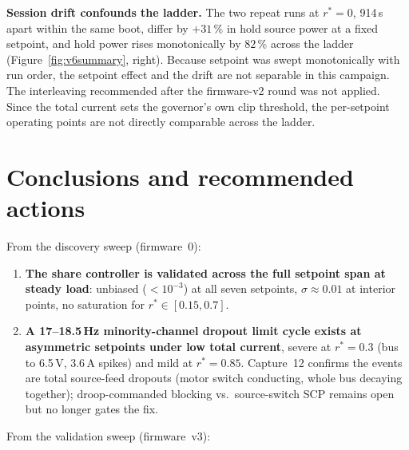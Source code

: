 \documentclass[11pt]{article}
\begin{document}
\textbf{Session drift confounds the ladder.} The two repeat runs at $r^\ast=0$,
914\,s apart within the same boot, differ by $+31\,\%$ in hold source power at a
fixed setpoint, and hold power rises monotonically by $82\,\%$ across the ladder
(Figure~\ref{fig:v6summary}, right). Because setpoint was swept monotonically
with run order, the setpoint effect and the drift are not separable in this
campaign. The interleaving recommended after the firmware-v2 round was not
applied. Since the total current sets the governor's own clip threshold, the
per-setpoint operating points are not directly comparable across the ladder.

\section{Conclusions and recommended actions}
\label{sec:conclusions}

From the discovery sweep (firmware~0):

\begin{enumerate}
\item \textbf{The share controller is validated across the full setpoint span at
steady load}: unbiased ($<10^{-3}$) at all seven setpoints, $\sigma\approx0.01$ at
interior points, no saturation for $r^\ast\in[0.15,0.7]$.
\item \textbf{A 17--18.5\,Hz minority-channel dropout limit cycle exists at
asymmetric setpoints under low total current}, severe at $r^\ast=0.3$ (bus to
6.5\,V, 3.6\,A spikes) and mild at $r^\ast=0.85$. Capture~12 confirms the events are
total source-feed dropouts (motor switch conducting, whole bus decaying together);
droop-commanded blocking vs.\ source-switch SCP remains open but no longer gates the
fix.
\end{enumerate}

From the validation sweep (firmware~v3):
\end{document}
